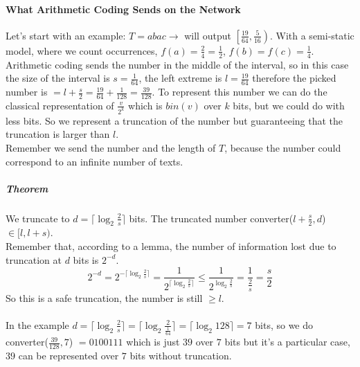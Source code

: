 \documentclass[10pt]{report}
\begin{document}
\paragraph{What Arithmetic Coding Sends on the Network} Let's start with an example: $T=abac\longrightarrow$ will output $\left[\frac{19}{64},\frac{5}{16}\right)$. With a semi-static model, where we count occurrences, $f(a)=\frac{2}{4} = \frac{1}{2}$, $f(b)=f(c)=\frac{1}{4}$. Arithmetic coding sends the number in the middle of the interval, so in this case the size of the interval is $s=\frac{1}{64}$, the left extreme is $l=\frac{19}{64}$ therefore the picked number is $= l + \frac{s}{2} = \frac{19}{64}+\frac{1}{128} = \frac{39}{128}$. To represent this number we can do the classical representation of $\frac{v}{2^k}$ which is $bin(v)$ over $k$ bits, but we could do with less bits. So we represent a truncation of the number but guaranteeing that the truncation is larger than $l$.\\
Remember we send the number and the length of $T$, because the number could correspond to an infinite number of texts.
\subparagraph{Theorem} We truncate to $d=\lceil\log_2\frac{2}{s}\rceil$ bits. The truncated number converter($l+\frac{s}{2},d$)$\in[l,l+s)$.\\
Remember that, according to a lemma, the number of information lost due to truncation at $d$ bits is $2^{-d}$.
$$2^{-d} = 2^{-\lceil\log_2\frac{2}{s}\rceil} = \frac{1}{2^{\lceil\log_2\frac{2}{s}\rceil}}\leq \frac{1}{2^{\log_2\frac{2}{s}}} = \frac{1}{\frac{2}{s}} = \frac{s}{2}$$
So this is a safe truncation, the number is still $\geq l$.\\\\
In the example $d = \lceil \log_2 \frac{2}{s}\rceil = \lceil\log_2\frac{2}{\frac{1}{64}}\rceil = \lceil\log_2 128\rceil = 7$ bits, so we do converter($\frac{39}{128},7$) $= 0100111$ which is just $39$ over $7$ bits but it's a particular case, $39$ can be represented over $7$ bits without truncation.
\end{document}
